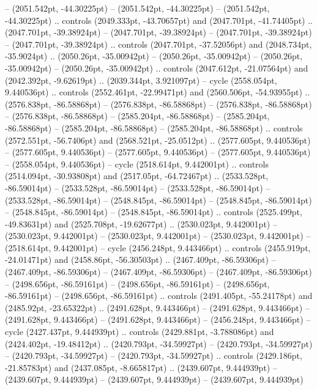  -- (2051.542pt, -44.30225pt)
 -- (2051.542pt, -44.30225pt)
 -- (2051.542pt, -44.30225pt) .. controls (2049.333pt, -43.70657pt) and (2047.701pt, -41.74405pt) .. (2047.701pt, -39.38924pt)
 -- (2047.701pt, -39.38924pt)
 -- (2047.701pt, -39.38924pt)
 -- (2047.701pt, -39.38924pt) .. controls (2047.701pt, -37.52056pt) and (2048.734pt, -35.9024pt) .. (2050.26pt, -35.00942pt)
 -- (2050.26pt, -35.00942pt)
 -- (2050.26pt, -35.00942pt)
 -- (2050.26pt, -35.00942pt) .. controls (2047.612pt, -21.07564pt) and (2042.392pt, -9.62619pt) .. (2039.344pt, 3.921097pt) -- cycle
(2558.054pt, 9.440536pt) .. controls (2552.461pt, -22.99471pt) and (2560.506pt, -54.93955pt) .. (2576.838pt, -86.58868pt)
 -- (2576.838pt, -86.58868pt)
 -- (2576.838pt, -86.58868pt)
 -- (2576.838pt, -86.58868pt)
 -- (2585.204pt, -86.58868pt)
 -- (2585.204pt, -86.58868pt)
 -- (2585.204pt, -86.58868pt)
 -- (2585.204pt, -86.58868pt) .. controls (2572.551pt, -56.7406pt) and (2568.521pt, -25.0512pt) .. (2577.605pt, 9.440536pt)
 -- (2577.605pt, 9.440536pt)
 -- (2577.605pt, 9.440536pt)
 -- (2577.605pt, 9.440536pt)
 -- (2558.054pt, 9.440536pt) -- cycle
(2518.614pt, 9.442001pt) .. controls (2514.094pt, -30.93808pt) and (2517.05pt, -64.72467pt) .. (2533.528pt, -86.59014pt)
 -- (2533.528pt, -86.59014pt)
 -- (2533.528pt, -86.59014pt)
 -- (2533.528pt, -86.59014pt)
 -- (2548.845pt, -86.59014pt)
 -- (2548.845pt, -86.59014pt)
 -- (2548.845pt, -86.59014pt)
 -- (2548.845pt, -86.59014pt) .. controls (2525.499pt, -49.83631pt) and (2525.708pt, -19.62677pt) .. (2530.023pt, 9.442001pt)
 -- (2530.023pt, 9.442001pt)
 -- (2530.023pt, 9.442001pt)
 -- (2530.023pt, 9.442001pt)
 -- (2518.614pt, 9.442001pt) -- cycle
(2456.248pt, 9.443466pt) .. controls (2455.919pt, -24.01471pt) and (2458.86pt, -56.30503pt) .. (2467.409pt, -86.59306pt)
 -- (2467.409pt, -86.59306pt)
 -- (2467.409pt, -86.59306pt)
 -- (2467.409pt, -86.59306pt)
 -- (2498.656pt, -86.59161pt)
 -- (2498.656pt, -86.59161pt)
 -- (2498.656pt, -86.59161pt)
 -- (2498.656pt, -86.59161pt) .. controls (2491.405pt, -55.24178pt) and (2485.92pt, -23.65322pt) .. (2491.628pt, 9.443466pt)
 -- (2491.628pt, 9.443466pt)
 -- (2491.628pt, 9.443466pt)
 -- (2491.628pt, 9.443466pt)
 -- (2456.248pt, 9.443466pt) -- cycle
(2427.437pt, 9.444939pt) .. controls (2429.881pt, -3.788086pt) and (2424.402pt, -19.48412pt) .. (2420.793pt, -34.59927pt)
 -- (2420.793pt, -34.59927pt)
 -- (2420.793pt, -34.59927pt)
 -- (2420.793pt, -34.59927pt) .. controls (2429.186pt, -21.85783pt) and (2437.085pt, -8.665817pt) .. (2439.607pt, 9.444939pt)
 -- (2439.607pt, 9.444939pt)
 -- (2439.607pt, 9.444939pt)
 -- (2439.607pt, 9.444939pt)
